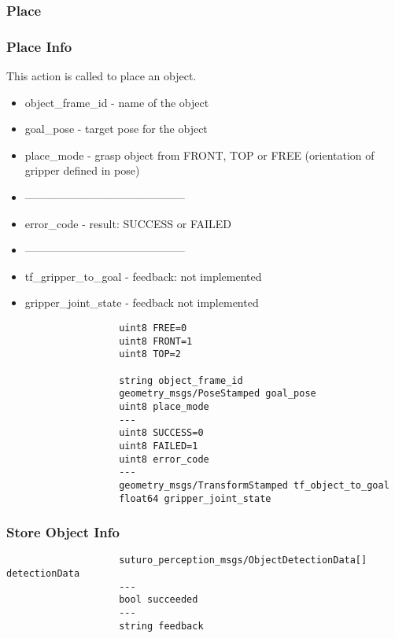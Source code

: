 \documentclass[main.tex]{subfiles}
\begin{document}
				\subsubsection{Place}
				\subsubsection{Place Info}
				This action is called to place an object.
				\begin{itemize}
					\item object\_frame\_id - name of the object
					\item goal\_pose - target pose for the object
					\item place\_mode - grasp object from FRONT, TOP or FREE (orientation of gripper defined in pose)
					\item --------------------------------------------
					\item error\_code - result: SUCCESS or FAILED
					\item --------------------------------------------
					\item tf\_gripper\_to\_goal - feedback: not implemented
					\item gripper\_joint\_state - feedback not implemented
				\end{itemize}
					\begin{lstlisting}
					uint8 FREE=0
					uint8 FRONT=1
					uint8 TOP=2
		
					string object_frame_id
					geometry_msgs/PoseStamped goal_pose
					uint8 place_mode
					---
					uint8 SUCCESS=0
					uint8 FAILED=1
					uint8 error_code
					---
					geometry_msgs/TransformStamped tf_object_to_goal
					float64 gripper_joint_state
					\end{lstlisting}
				\subsubsection{Store Object Info}
					\begin{lstlisting}
					suturo_perception_msgs/ObjectDetectionData[] detectionData
					---
					bool succeeded
					---
					string feedback
					\end{lstlisting}
		\endgroup
\end{document}
